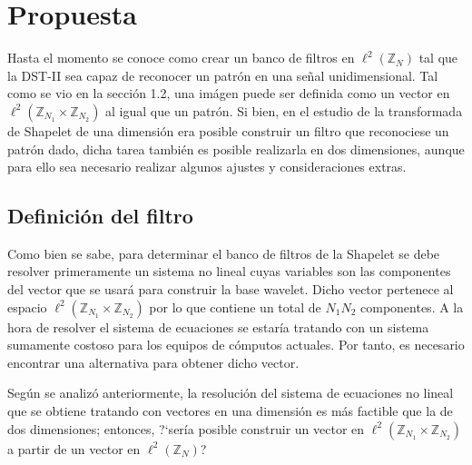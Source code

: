 \chapter{Propuesta}\label{chapter:proposal}

\par Hasta el momento se conoce como crear un banco de filtros en $\ell^2(\mathbb{Z}_N)$ tal que la DST-II sea capaz de reconocer un patr\'on en una se\~nal unidimensional. Tal como se vio en la secci\'on 1.2, una im\'agen puede ser definida como un vector en $\ell^2(\mathbb{Z}_{N_1}\times\mathbb{Z}_{N_2})$ al igual que un patr\'on. Si bien, en el estudio de la transformada de Shapelet de una dimensi\'on era posible construir un filtro que reconociese un patr\'on dado, dicha tarea tambi\'en es posible realizarla en dos dimensiones, aunque para ello sea necesario realizar algunos ajustes y consideraciones extras.\\

\section{Definici\'on del filtro}

\par Como bien se sabe, para determinar el banco de filtros de la Shapelet se debe resolver primeramente un sistema no lineal cuyas variables son las componentes del vector que se usar\'a para construir la base wavelet. Dicho vector pertenece al espacio $\ell^2(\mathbb{Z}_{N_1}\times\mathbb{Z}_{N_2})$ por lo que contiene un total de $N_1N_2$ componentes. A la hora de resolver el sistema de ecuaciones se estar\'ia tratando con un sistema sumamente costoso para los equipos de c\'omputos actuales. Por tanto, es necesario encontrar una alternativa para obtener dicho vector.\\

\par Seg\'un se analiz\'o anteriormente, la resoluci\'on del sistema de ecuaciones no lineal que se obtiene tratando con vectores en una dimensi\'on es m\'as factible que la de dos dimensiones; entonces, ?`ser\'ia posible construir un vector en $\ell^2(\mathbb{Z}_{N_1}\times\mathbb{Z}_{N_2})$ a partir de un vector en $\ell^2(\mathbb{Z}_N)$?

